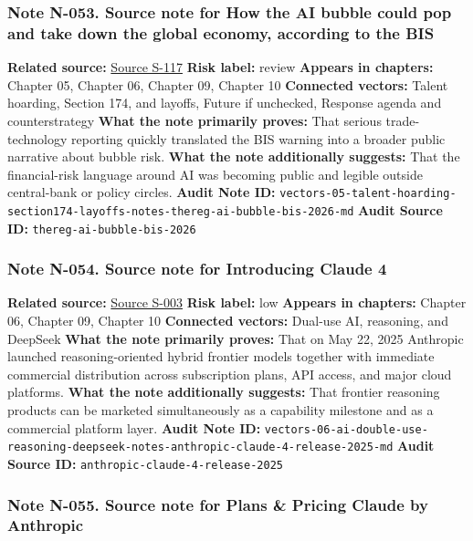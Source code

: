 \documentclass[
  american,
  11pt,
  letterpaper,
]{article}
\begin{document}
\subsubsection{Note N-053. Source note for How the AI bubble could pop
and take down the global economy, according to the
BIS}\label{note-n-053-vectors-05-talent-hoarding-section174-layoffs-notes-thereg-ai-bubble-bis-2026-md}

\textbf{Related source:}
\hyperref[source-s-117-how-the-ai-bubble-could-pop-and-take-down-the-global-economy-according-to-the-bis]{Source
S-117} \textbf{Risk label:} review \textbf{Appears in chapters:} Chapter
05, Chapter 06, Chapter 09, Chapter 10 \textbf{Connected vectors:}
Talent hoarding, Section 174, and layoffs, Future if unchecked, Response
agenda and counterstrategy \textbf{What the note primarily proves:} That
serious trade-technology reporting quickly translated the BIS warning
into a broader public narrative about bubble risk. \textbf{What the note
additionally suggests:} That the financial-risk language around AI was
becoming public and legible outside central-bank or policy circles.
\textbf{Audit Note ID:}
\texttt{vectors-05-talent-hoarding-section174-layoffs-notes-thereg-ai-bubble-bis-2026-md}
\textbf{Audit Source ID:} \texttt{thereg-ai-bubble-bis-2026}

\subsubsection{Note N-054. Source note for Introducing Claude
4}\label{note-n-054-vectors-06-ai-double-use-reasoning-deepseek-notes-anthropic-claude-4-release-2025-md}

\textbf{Related source:}
\hyperref[source-s-003-introducing-claude-4]{Source S-003} \textbf{Risk
label:} low \textbf{Appears in chapters:} Chapter 06, Chapter 09,
Chapter 10 \textbf{Connected vectors:} Dual-use AI, reasoning, and
DeepSeek \textbf{What the note primarily proves:} That on May 22, 2025
Anthropic launched reasoning-oriented hybrid frontier models together
with immediate commercial distribution across subscription plans, API
access, and major cloud platforms. \textbf{What the note additionally
suggests:} That frontier reasoning products can be marketed
simultaneously as a capability milestone and as a commercial platform
layer. \textbf{Audit Note ID:}
\texttt{vectors-06-ai-double-use-reasoning-deepseek-notes-anthropic-claude-4-release-2025-md}
\textbf{Audit Source ID:} \texttt{anthropic-claude-4-release-2025}

\subsubsection{Note N-055. Source note for Plans \& Pricing \textbar{}
Claude by
Anthropic}\label{note-n-055-vectors-06-ai-double-use-reasoning-deepseek-notes-anthropic-claude-pricing-2026-md}
\end{document}
